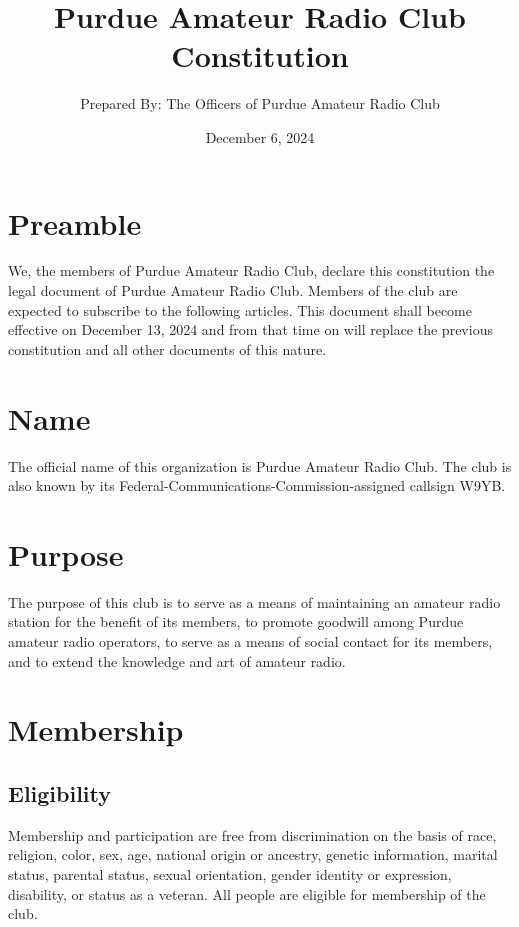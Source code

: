 \documentclass{article}
\title{Purdue Amateur Radio Club Constitution}
\author{Prepared By: The Officers of Purdue Amateur Radio Club}
\date{December 6, 2024}
\begin{document}
\maketitle \vspace{3ex}

\tableofcontents
\newpage

\setcounter{section}{-1}
\section{Preamble}

We, the members of Purdue Amateur Radio Club, declare this constitution the
legal document of Purdue Amateur Radio Club. Members of the club are expected to
subscribe to the following articles. This document shall become effective on
December 13, 2024 and from that time on will replace the previous constitution
and all other documents of this nature.

\section{Name}

The official name of this organization is Purdue Amateur Radio Club. The club is
also known by its Federal-Communications-Commission-assigned callsign W9YB.

\section{Purpose}

The purpose of this club is to serve as a means of maintaining an amateur radio
station for the benefit of its members, to promote goodwill among Purdue amateur
radio operators, to serve as a means of social contact for its members, and to
extend the knowledge and art of amateur radio.

\section{Membership}

\subsection{Eligibility}

Membership and participation are free from discrimination on the basis of race,
religion, color, sex, age, national origin or ancestry, genetic information,
marital status, parental status, sexual orientation, gender identity or
expression, disability, or status as a veteran. All people are eligible for
membership of the club.
\end{document}

